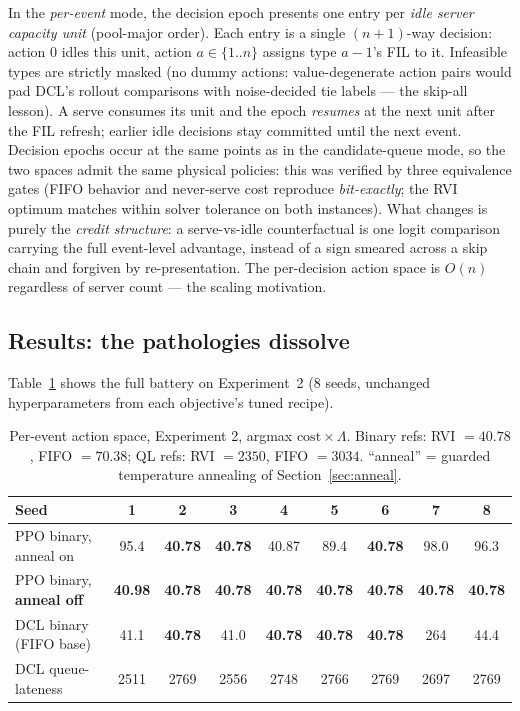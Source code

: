\documentclass[11pt,a4paper]{article}
\begin{document}
In the \emph{per-event} mode, the decision epoch presents one entry per
\emph{idle server capacity unit} (pool-major order).  Each entry is a
single $(n{+}1)$-way decision: action $0$ idles this unit, action
$a \in \{1..n\}$ assigns type $a{-}1$'s FIL to it.  Infeasible types are
strictly masked (no dummy actions: value-degenerate action pairs would
pad DCL's rollout comparisons with noise-decided tie labels --- the
skip-all lesson).  A serve consumes its unit and the epoch \emph{resumes}
at the next unit after the FIL refresh; earlier idle decisions stay
committed until the next event.  Decision epochs occur at the same points
as in the candidate-queue mode, so the two spaces admit the same
physical policies: this was verified by three equivalence gates (FIFO
behavior and never-serve cost reproduce \emph{bit-exactly}; the RVI
optimum matches within solver tolerance on both instances).  What
changes is purely the \emph{credit structure}: a serve-vs-idle
counterfactual is one logit comparison carrying the full event-level
advantage, instead of a sign smeared across a skip chain and forgiven by
re-presentation.  The per-decision action space is $O(n)$ regardless of
server count --- the scaling motivation.

\subsection{Results: the pathologies dissolve}

Table~\ref{tab:pe} shows the full battery on Experiment~2 (8 seeds,
unchanged hyperparameters from each objective's tuned recipe).

\begin{table}[h]
\centering
\caption{Per-event action space, Experiment 2, argmax
$\mathrm{cost}\times\Lambda$.  Binary refs: RVI $=40.78$, FIFO $=70.38$;
QL refs: RVI $=2350$, FIFO $=3034$.  ``anneal'' = guarded temperature
annealing of Section~\ref{sec:anneal}.}
\label{tab:pe}
\begin{tabular}{lcccccccc}
\toprule
Seed & 1 & 2 & 3 & 4 & 5 & 6 & 7 & 8 \\
\midrule
PPO binary, anneal on & 95.4 & \textbf{40.78} & \textbf{40.78} & 40.87 &
89.4 & \textbf{40.78} & 98.0 & 96.3 \\
PPO binary, \textbf{anneal off} & \textbf{40.98} & \textbf{40.78} &
\textbf{40.78} & \textbf{40.78} & \textbf{40.78} & \textbf{40.78} &
\textbf{40.78} & \textbf{40.78} \\
DCL binary (FIFO base) & 41.1 & \textbf{40.78} & 41.0 & \textbf{40.78} &
\textbf{40.78} & \textbf{40.78} & 264 & 44.4 \\
DCL queue-lateness & 2511 & 2769 & 2556 & 2748 & 2766 & 2769 & 2697 &
2769 \\
\bottomrule
\end{tabular}
\end{table}
\end{document}
